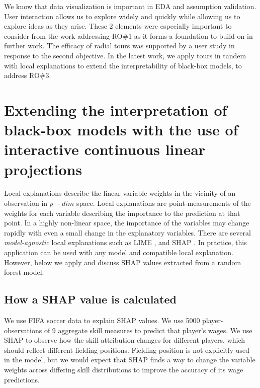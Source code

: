 \documentclass{template/monashthesis}
\begin{document}
We know that data visualization is important in EDA and assumption validation. User interaction allows us to explore widely and quickly while allowing us to explore ideas as they arise. These 2 elements were especially important to consider from the work addressing RO\#1 as it forms a foundation to build on in further work. The efficacy of radial tours was supported by a user study in response to the second objective. In the latest work, we apply tours in tandem with local explanations to extend the interpretability of black-box models, to address RO\#3.

\hypertarget{extending-the-interpretation-of-black-box-models-with-the-use-of-interactive-continuous-linear-projections}{%
\section{Extending the interpretation of black-box models with the use of interactive continuous linear projections}\label{extending-the-interpretation-of-black-box-models-with-the-use-of-interactive-continuous-linear-projections}}

Local explanations describe the linear variable weights in the vicinity of an observation in \(p-dim\) space. Local explanations are point-measurements of the weights for each variable describing the importance to the prediction at that point. In a highly non-linear space, the importance of the variables may change rapidly with even a small change in the explanatory variables. There are several \emph{model-agnostic} local explanations such as LIME \autocite{ribeiro_why_2016}, and SHAP \autocite{lundberg_unified_2017}. In practice, this application can be used with any model and compatible local explanation. However, below we apply and discuss SHAP values extracted from a random forest model.

\hypertarget{how-a-shap-value-is-calculated}{%
\subsection{How a SHAP value is calculated}\label{how-a-shap-value-is-calculated}}

We use FIFA soccer data \autocite{leone_fifa_2020} to explain SHAP values. We use 5000 player-observations of 9 aggregate skill measures to predict that player's wages. We use SHAP to observe how the skill attribution changes for different players, which should reflect different fielding positions. Fielding position is not explicitly used in the model, but we would expect that SHAP finds a way to change the variable weights across differing skill distributions to improve the accuracy of its wage predictions.
\end{document}
